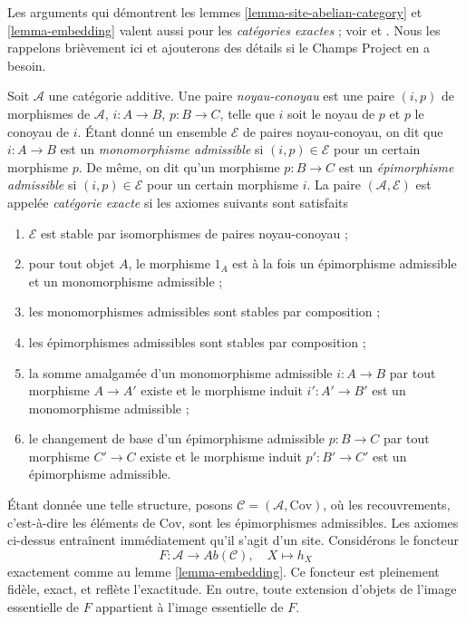 \begin{remark}
\label{remark-embed-exact-category}
Les arguments qui démontrent les lemmes
\ref{lemma-site-abelian-category} et \ref{lemma-embedding} valent aussi pour
les {\it catégories exactes} ; voir \cite[Appendix A]{Buhler} et
\cite[1.1.4]{BBD}. Nous les rappelons brièvement ici et ajouterons des détails
si le Champs Project en a besoin.

\medskip\noindent
Soit $\mathcal{A}$ une catégorie additive. Une paire {\it noyau-conoyau} est
une paire $(i, p)$ de morphismes de $\mathcal{A}$,
$i : A \to B$, $p : B \to C$, telle que $i$ soit le noyau de $p$ et $p$ le
conoyau de $i$. Étant donné un ensemble $\mathcal{E}$ de paires
noyau-conoyau, on dit que $i : A \to B$ est un
{\it monomorphisme admissible} si $(i, p) \in \mathcal{E}$ pour un certain
morphisme $p$. De même, on dit qu'un morphisme $p : B \to C$ est un
{\it épimorphisme admissible} si $(i, p) \in \mathcal{E}$ pour un certain
morphisme $i$. La paire $(\mathcal{A}, \mathcal{E})$ est appelée
{\it catégorie exacte} si les axiomes suivants sont satisfaits
\begin{enumerate}
\item $\mathcal{E}$ est stable par isomorphismes de paires noyau-conoyau ;
\item pour tout objet $A$, le morphisme $1_A$ est à la fois un épimorphisme
admissible et un monomorphisme admissible ;
\item les monomorphismes admissibles sont stables par composition ;
\item les épimorphismes admissibles sont stables par composition ;
\item la somme amalgamée d'un monomorphisme admissible $i : A \to B$ par tout
morphisme $A \to A'$ existe et le morphisme induit $i' : A' \to B'$ est un
monomorphisme admissible ;
\item le changement de base d'un épimorphisme admissible $p : B \to C$ par
tout morphisme $C' \to C$ existe et le morphisme induit $p' : B' \to C'$ est
un épimorphisme admissible.
\end{enumerate}
Étant donnée une telle structure, posons
$\mathcal{C} = (\mathcal{A}, \text{Cov})$, où les recouvrements, c'est-à-dire
les éléments de $\text{Cov}$, sont les épimorphismes admissibles. Les axiomes
ci-dessus entraînent immédiatement qu'il s'agit d'un site. Considérons le
foncteur
$$
F : \mathcal{A} \longrightarrow \textit{Ab}(\mathcal{C}), \quad
X \longmapsto h_X
$$
exactement comme au lemme \ref{lemma-embedding}. Ce foncteur est pleinement
fidèle, exact, et reflète l'exactitude. En outre, toute extension d'objets de
l'image essentielle de $F$ appartient à l'image essentielle de $F$.
\end{remark}






